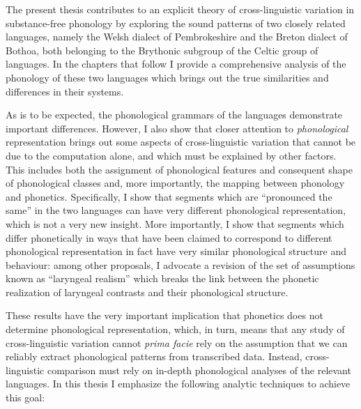 The present thesis contributes to an explicit theory of cross\hyp linguistic variation in substance\hyp free phonology by exploring the sound patterns of two closely related languages, namely the Welsh dialect of Pembrokeshire and the Breton dialect of Bothoa, both belonging to the Brythonic subgroup of the Celtic group of languages. In the chapters that follow I provide a comprehensive analysis of the phonology of these two languages which brings out the true similarities and differences in their systems.

As is to be expected, the phonological grammars of the languages demonstrate important differences. However, I also show that closer attention to \emph{phonological} representation brings out some aspects of cross\hyp linguistic variation that cannot be due to the computation alone, and which must be explained by other factors. This includes both the assignment of phonological features and consequent shape of phonological classes and, more importantly, the mapping between phonology and phonetics. Specifically, I show that segments which are \enquote{pronounced the same} in the two languages can have very different phonological representation, which is not a very new insight. More importantly, I show that segments which differ phonetically in ways that have been claimed to correspond to different phonological representation in fact have very similar phonological structure and behaviour: among other proposals, I advocate a revision of the set of assumptions known as \enquote{laryngeal realism} which breaks the link between the phonetic realization of laryngeal contrasts and their phonological structure.

These results have the very important implication that phonetics does not determine phonological representation, which, in turn, means that any study of cross\hyp linguistic variation cannot \emph{prima facie} rely on the assumption that we can reliably extract phonological patterns from transcribed data. Instead, cross\hyp linguistic comparison must rely on in\hyp depth phonological analyses of the relevant languages. In this thesis I emphasize the following analytic techniques to achieve this goal:

